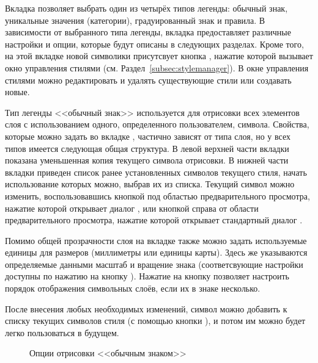 Вкладка  позволяет выбрать один из четырёх типов легенды:
обычный знак, уникальные значения (категории), градуированный знак и правила.
В зависимости от выбранного типа легенды, вкладка  предоставляет
различные настройки и опции, которые будут описаны в следующих разделах.
Кроме того, на этой вкладке новой символики присутсвует кнопка
, нажатие которой вызывает окно управления
стилями (см. Раздел~\ref{subsec:stylemanager}). В окне управления стилями
можно редактировать и удалять существующие стили или создавать новые.


Тип легенды <<обычный знак>> используется для отрисовки всех элементов слоя с
использованием одного, определенного пользователем, символа. Свойства, которые
можно задать во вкладке , частично зависят от типа слоя, но у всех
типов имеется следующая общая структура. В левой верхней части вкладки
показана уменьшенная копия текущего символа отрисовки. В нижней части
вкладки приведен список ранее установленных символов текущего стиля, начать
использование которых можно, выбрав их из списка. Текущий символ можно
изменить, воспользовавшись кнопкой  под областью
предварительного просмотра, нажатие которой открывает диалог
, или кнопкой  справа от области
предварительного просмотра, нажатие которой открывает стандартный диалог
.

Помимо общей прозрачности слоя на вкладке  также можно задать
используемые единицы для размеров (миллиметры или единицы карты). Здесь же
указываются определяемые данными масштаб и вращение знака (соответсвующие
настройки доступны по нажатию на кнопку ). Нажатие
на кнопку  позволяет настроить порядок отображения
символьных слоёв, если их в знаке несколько.

После внесения любых необходимых изменений, символ можно добавить к списку
текущих символов стиля (с помощью кнопки ), и
потом им можно будет легко пользоваться в будущем.

\begin{figure}[ht]
\centering
   \hspace{1cm}
   \hspace{1cm}
\caption{Опции отрисовки <<обычным знаком>> \wincaption}
\end{figure}

